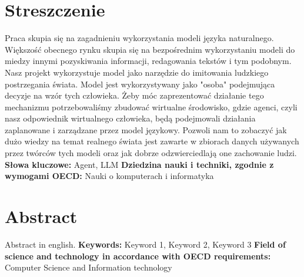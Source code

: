 \chapter*{Streszczenie}
Praca skupia się na zagadnieniu wykorzystania modeli języka naturalnego. Większość obecnego rynku skupia się na bezpośrednim wykorzystaniu modeli do miedzy innymi pozyskiwania informacji, redagowania tekstów i tym podobnym. Nasz projekt wykorzystuje model jako narzędzie do imitowania ludzkiego postrzegania świata. Model jest wykorzystywany jako "osoba" podejmująca decyzje na wzór tych człowieka. Żeby móc zaprezentować działanie tego mechanizmu potrzebowaliśmy zbudować wirtualne środowisko, gdzie agenci, czyli nasz odpowiednik wirtualnego człowieka, będą podejmowali działania zaplanowane i zarządzane przez model językowy. Pozwoli nam to zobaczyć jak dużo wiedzy na temat realnego świata jest zawarte w zbiorach danych używanych przez twórców tych modeli oraz jak dobrze odzwierciedlają one zachowanie ludzi.
\newline
\newline
\textbf{Słowa kluczowe:} 
Agent, LLM
\newline
\textbf{Dziedzina nauki i techniki, zgodnie z wymogami OECD: }
\newline
Nauki o komputerach i informatyka


\chapter*{Abstract}
Abstract in english.
\newline
\newline
\textbf{Keywords:}
Keyword 1, Keyword 2, Keyword 3
\newline
\textbf{Field of science and technology in accordance with OECD requirements: } \newline
Computer Science and Information technology
